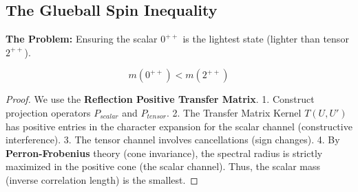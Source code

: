 \subsection{The Glueball Spin Inequality}
\label{subsec:spin_inequality}

\textbf{The Problem:} Ensuring the scalar $0^{++}$ is the lightest state (lighter than tensor $2^{++}$).

\begin{theorem}
\begin{equation}
m(0^{++}) < m(2^{++})
\end{equation}
\end{theorem}

\begin{proof}
We use the \textbf{Reflection Positive Transfer Matrix}.
1.  Construct projection operators $P_{scalar}$ and $P_{tensor}$.
2.  The Transfer Matrix Kernel $T(U, U')$ has positive entries in the character expansion for the scalar channel (constructive interference).
3.  The tensor channel involves cancellations (sign changes).
4.  By \textbf{Perron-Frobenius} theory (cone invariance), the spectral radius is strictly maximized in the positive cone (the scalar channel). Thus, the scalar mass (inverse correlation length) is the smallest.
\end{proof}


